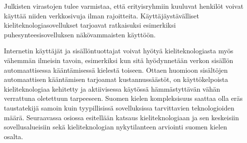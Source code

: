 \documentclass[]{../../metanetpaper}
\begin{document}
\begin{multicols}{2}
Julkisten virastojen tulee varmistaa, että erityisryhmiin kuuluvat
henkilöt voivat käyttää niiden verkkosivuja ilman
rajoitteita. Käyttäjäystävälliset kieliteknologiasovellukset tarjoavat
ratkaisuksi esimerkiksi puhesynteesisovelluksen näkövammaisten
käyttöön.

Internetin käyttäjät ja sisällöntuottajat voivat hyötyä
kieliteknologiasta myös vähemmän ilmeisin tavoin, esimerkiksi kun sitä
hyödynnetään verkon sisällön automaattisessa kääntämisessä kielestä
toiseen. Ottaen huomioon  sisältöjen automaattisen
kääntämisen tarjoamat kustannussäästöt, on käyttökelpoista kieliteknologiaa kehitetty 
ja aktiivisessa käytössä hämmästyttävän vähän 
verrattuna oletettuun tarpeeseen. Suomen kielen kompleksisuus saattaa olla 
eräs taustatekijä samoin kuin tyypillisissä sovelluksissa tarvittavien 
teknologioiden määrä. Seuraavassa osiossa esitellään katsaus kieliteknologiaan 
ja sen keskeisiin sovellusalueisiin sekä kieliteknologian
nykytilanteen arviointi suomen kielen osalta.



\end{multicols}
\clearpage
{}
\end{document}
